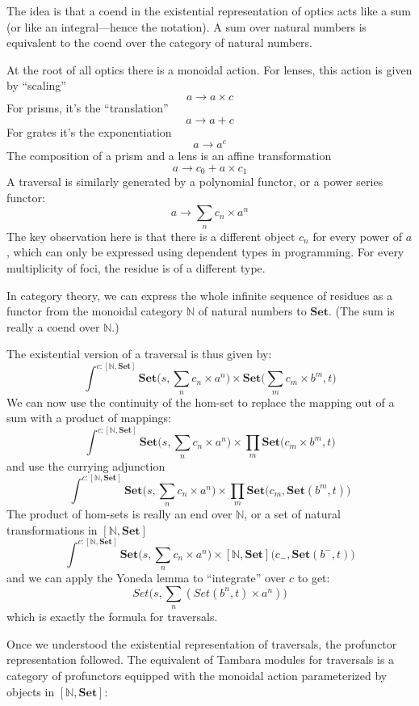 \documentclass[11pt]{amsart}
\begin{document}
The idea is that a coend in the existential representation of optics acts like a sum (or like an integral---hence the notation). A sum over natural numbers is equivalent to the coend over the category of natural numbers. 

At the root of all optics there is a monoidal action. For lenses, this action is given by ``scaling''
\[ a \to a \times c \]
For prisms, it's the ``translation''
\[a \to a + c \]
For grates it's the exponentiation
\[a \to a^c \]
The composition of a prism and a lens is an affine transformation
\[a \to c_0 + a \times c_1 \]
A traversal is similarly generated by a polynomial functor, or a power series functor:
\[ a \to \sum_n c_n \times a^n \]
The key observation here is that there is a different object $c_n$ for every power of $a$, which can only be expressed using dependent types in programming. For every multiplicity of foci, the residue is of a different type. 

In category theory, we can express the whole infinite sequence of residues as a functor from the monoidal category $\mathbb{N}$ of natural numbers to $\mathbf{Set}$. (The sum is really a coend over $\mathbb{N}$.)

The existential version of a traversal is thus given by:
\[ \int^{c \colon [\mathbb{N}, \mathbf{Set}]}  \mathbf{Set}\big(s, \sum_n c_n \times a^n\big) \times  \mathbf{Set}\big( \sum_m c_m \times b^m, t\big) \]
We can now use the continuity of the hom-set to replace the mapping out of a sum with a product of mappings:
\[ \int^{c \colon [\mathbb{N}, \mathbf{Set}]}  \mathbf{Set}\big(s, \sum_n c_n \times a^n\big) \times  \prod_m \mathbf{Set}\big( c_m \times b^m, t\big) \]
and use the currying adjunction
\[  \int^{c \colon [\mathbb{N}, \mathbf{Set}]}  \mathbf{Set}\big(s, \sum_n c_n \times a^n\big) \times  \prod_m \mathbf{Set}\big( c_m, \mathbf{Set}( b^m, t)\big) \]
The product of hom-sets is really an end over $\mathbb{N}$, or a set of natural transformations in $[\mathbb{N}, \mathbf{Set}]$
\[  \int^{c \colon [\mathbb{N}, \mathbf{Set}]}  \mathbf{Set}\big(s, \sum_n c_n \times a^n\big) \times  [\mathbb{N}, \mathbf{Set}]\big( c_-, \mathbf{Set}( b^-, t)\big) \]
and we can apply the Yoneda lemma to ``integrate'' over $c$ to get:
\[ Set(s, \sum_n (Set(b^n, t) \times a^n)\big) \]
which is exactly the formula for traversals.

Once we understood the existential representation of traversals, the profunctor representation followed. The equivalent of Tambara modules for traversals is a category of profunctors equipped with the monoidal action parameterized by objects in $[\mathbb{N}, \mathbf{Set}]$:
\end{document}
